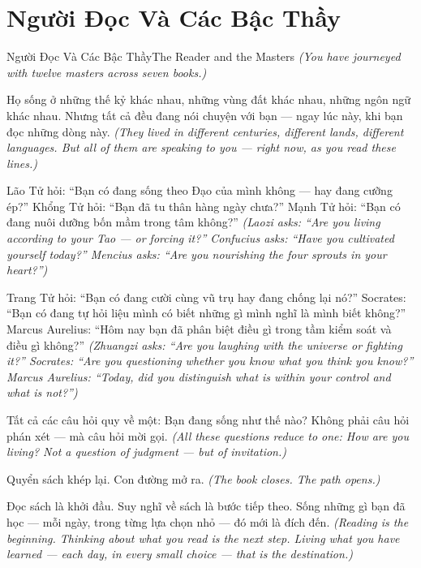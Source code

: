 \section{Người Đọc Và Các Bậc Thầy}
\begin{truyen}{Người Đọc Và Các Bậc Thầy}{The Reader and the Masters}
\textit{(You have journeyed with twelve masters across seven books.)}

Họ sống ở những thế kỷ khác nhau, những vùng đất khác nhau, những ngôn ngữ khác nhau. Nhưng tất cả đều đang nói chuyện với bạn — ngay lúc này, khi bạn đọc những dòng này.
\textit{(They lived in different centuries, different lands, different languages. But all of them are speaking to you — right now, as you read these lines.)}

Lão Tử hỏi: ``Bạn có đang sống theo Đạo của mình không — hay đang cưỡng ép?'' Khổng Tử hỏi: ``Bạn đã tu thân hàng ngày chưa?'' Mạnh Tử hỏi: ``Bạn có đang nuôi dưỡng bốn mầm trong tâm không?''
\textit{(Laozi asks: ``Are you living according to your Tao — or forcing it?'' Confucius asks: ``Have you cultivated yourself today?'' Mencius asks: ``Are you nourishing the four sprouts in your heart?'')}

Trang Tử hỏi: ``Bạn có đang cười cùng vũ trụ hay đang chống lại nó?'' Socrates: ``Bạn có đang tự hỏi liệu mình có biết những gì mình nghĩ là mình biết không?'' Marcus Aurelius: ``Hôm nay bạn đã phân biệt điều gì trong tầm kiểm soát và điều gì không?''
\textit{(Zhuangzi asks: ``Are you laughing with the universe or fighting it?'' Socrates: ``Are you questioning whether you know what you think you know?'' Marcus Aurelius: ``Today, did you distinguish what is within your control and what is not?'')}

Tất cả các câu hỏi quy về một: Bạn đang sống như thế nào? Không phải câu hỏi phán xét — mà câu hỏi mời gọi.
\textit{(All these questions reduce to one: How are you living? Not a question of judgment — but of invitation.)}

Quyển sách khép lại. Con đường mở ra.
\textit{(The book closes. The path opens.)}

\end{truyen}

\begin{baihoc}
Đọc sách là khởi đầu. Suy nghĩ về sách là bước tiếp theo. Sống những gì bạn đã học — mỗi ngày, trong từng lựa chọn nhỏ — đó mới là đích đến.
\textit{(Reading is the beginning. Thinking about what you read is the next step. Living what you have learned — each day, in every small choice — that is the destination.)}
\end{baihoc}
